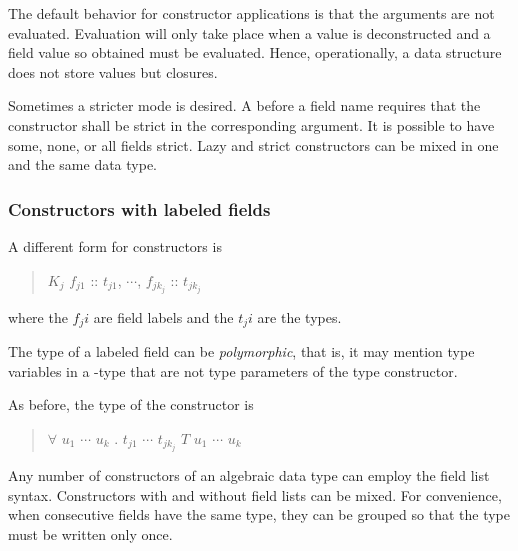The default behavior for constructor applications is that the arguments are not evaluated. Evaluation will only take place when a value is deconstructed and a field value so obtained must be evaluated. Hence, operationally, a data structure does not store values but closures.

Sometimes a stricter mode is desired. A \sym{!} before a field name requires that the constructor shall be strict in the corresponding argument. It is possible to have some, none, or all fields strict. Lazy and strict constructors can be mixed in one and the same data type.

\subsubsection{Constructors with labeled fields} \label{fieldconstructor}

A different form for constructors is

\begin{quote}
$K_j$ \bracea{} $f_{j1}$ :: $t_{j1}$, $\cdots$, $f_{j{k_j}}$ :: $t_{j{k_j}}$ \bracez{}
\end{quote}

where the $f_ji$ are field labels and the $t_ji$ are the types.

\label{polyrf} The type of a labeled field can be \emph{polymorphic}, that is, it may mention type variables in a -type that are not type parameters of the type constructor.


As before, the type of the constructor is

\begin{quote}
$\forall$ $u_1$ $\cdots$ $u_k$ . $t_{j1}$ \arrow{} $\cdots$ \arrow{} $t_{jk_j}$ \arrow{} $T$ $u_1$ $\cdots$ $u_k$
\end{quote}

Any number of constructors of an algebraic data type can employ the field list syntax. 
Constructors with and without field lists can be mixed.
For convenience, when consecutive fields have the same type, they can be grouped so that the type must be written only once.

